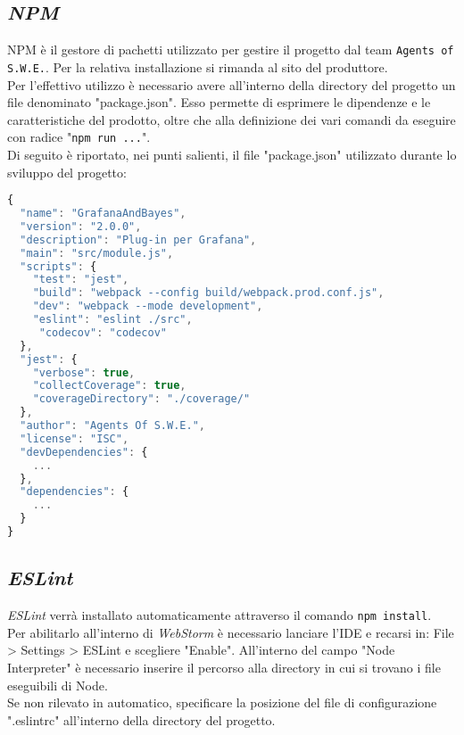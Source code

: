 \subsection{\textit{NPM}}\label{npm}
NPM è il gestore di pachetti utilizzato per gestire il progetto dal team \texttt{Agents of S.W.E.}. Per la relativa installazione si rimanda al sito del produttore.\\
Per l'effettivo utilizzo è necessario avere all'interno della directory del progetto un file denominato "package.json". Esso permette di esprimere le dipendenze e le caratteristiche del prodotto, oltre che alla definizione dei vari comandi da eseguire con radice "\texttt{npm run ...}".\\
Di seguito è riportato, nei punti salienti, il file "package.json" utilizzato durante lo sviluppo del progetto:\\
\begin{lstlisting}[language=JavaScript]
{
  "name": "GrafanaAndBayes",
  "version": "2.0.0",
  "description": "Plug-in per Grafana",
  "main": "src/module.js",
  "scripts": {
    "test": "jest",
    "build": "webpack --config build/webpack.prod.conf.js",
    "dev": "webpack --mode development",
    "eslint": "eslint ./src",
     "codecov": "codecov"
  },
  "jest": {
    "verbose": true,
    "collectCoverage": true,
    "coverageDirectory": "./coverage/"
  },
  "author": "Agents Of S.W.E.",
  "license": "ISC",
  "devDependencies": {
    ...
  },
  "dependencies": {
    ...
  }
}
\end{lstlisting}

\subsection{\textit{ESLint}}\label{eslint}
\textit{ESLint} verrà installato automaticamente attraverso il comando \texttt{npm install}.\\
Per abilitarlo all'interno di \textit{WebStorm} è necessario lanciare l'IDE e recarsi in: File > Settings > ESLint e scegliere "Enable". All'interno del campo "Node Interpreter" è necessario inserire il percorso alla directory in cui si trovano i file eseguibili di Node.\\
Se non rilevato in automatico, specificare la posizione del file di configurazione ".eslintrc" all'interno della directory del progetto.

